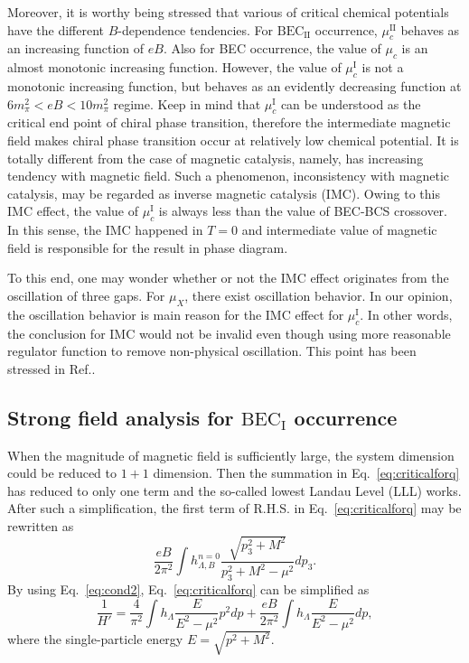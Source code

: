 \documentclass[prd, showpacs,nofootinbib,amsmath,amssymb,12pt]{revtex4}
\begin{document}
Moreover,  it is worthy being stressed that various of critical chemical potentials have the different $B$-dependence tendencies.
For $\text{BEC}_\text{II}$ occurrence, $\mu_c^\text{II}$  behaves as an increasing function of $eB$.
Also for BEC occurrence, the value of $\mu_c$ is  an almost  monotonic increasing function.
However, the value of $\mu_c^\text{I}$ is not a monotonic increasing function, but behaves as an evidently decreasing  function at $ 6 m_\pi^2 <eB < 10 m_\pi^2$ regime.
Keep in mind that $\mu_c^\text{I}$ can be understood as  the critical end point of chiral phase transition,
therefore the intermediate magnetic field makes   chiral phase transition occur at relatively low chemical potential.
It is totally different from the case  of magnetic catalysis, namely,  has  increasing tendency with magnetic field. Such a
phenomenon, inconsistency with magnetic catalysis,  may be regarded as inverse magnetic catalysis (IMC).
Owing to this IMC effect, the value of $\mu_c^\text{I}$ is always less than the value of BEC-BCS crossover. 
In this sense, the IMC happened in $T=0$ and intermediate value of magnetic field is responsible for the result in phase diagram.

To this end, one may wonder whether or not the IMC effect originates from the oscillation of three gaps.
For $\mu_X$, there exist oscillation behavior.
In our opinion, the oscillation behavior is main reason for the IMC effect for $\mu^\text{I}_c$.
In other words, the conclusion for IMC would not be invalid even though using more reasonable regulator function to remove non-physical oscillation. 
This point has been stressed in Ref.\cite{Duarte2015BEC}.

\subsection{Strong  field analysis for $\text{BEC}_\text{I}$ occurrence }
 When the magnitude of magnetic field is sufficiently large, the system dimension could be reduced to $1+1$ dimension. Then the summation in Eq.~\eqref{eq:criticalforq} has reduced to only one term
and the so-called lowest Landau Level (LLL) works.
After such a simplification, the first term  of R.H.S. in Eq.~\eqref{eq:criticalforq} may be rewritten as
\begin{equation}\label{eq:cond2}
 \frac{eB}{ 2\pi^2} \int h_{\Lambda,B}^{n=0}
\frac{ \sqrt{p_3^2 + M^2}}{p_3^2 + M^2 - \mu^2} dp_3.
\end{equation}
By using Eq.~\eqref{eq:cond2}, Eq.~\eqref{eq:criticalforq} can be simplified as
\begin{equation}\label{eq:cond3}
  \frac{1}{H'} = \frac{4}{\pi^2}\int h_\Lambda \frac{E}{E^2-\mu^2} p^2 dp + \frac{eB}{2\pi^2} \int h_\Lambda
  \frac{E}{E^2-\mu^2} dp,
\end{equation}
where the single-particle energy $E= \sqrt{p^2 +M^2}$.
\end{document}
